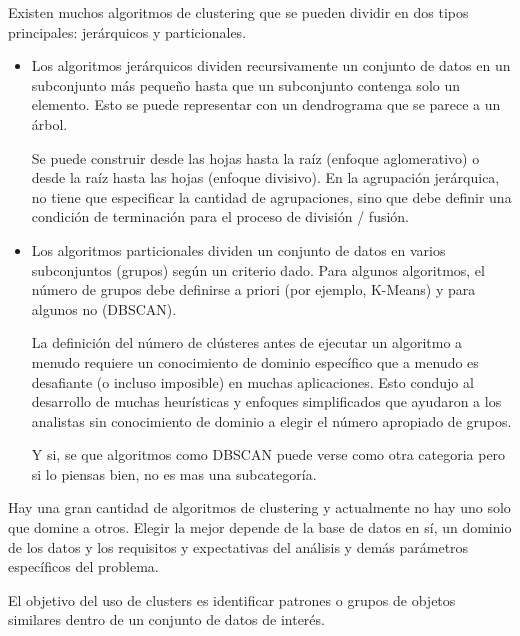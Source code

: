\documentclass[12pt, fleqn]{report}                             %
\theoremstyle{break}                                            %
\begin{document}
        Existen muchos algoritmos de clustering que se pueden dividir en dos tipos principales: 
        jerárquicos y particionales.

        \clearpage

        \begin{itemize}
            \item Los algoritmos jerárquicos dividen recursivamente un conjunto de datos en 
            un subconjunto más pequeño hasta que un subconjunto contenga solo un elemento. 
            Esto se puede representar con un dendrograma que se parece a un árbol. 
            
            Se puede construir desde las hojas hasta la raíz (enfoque aglomerativo) o desde la raíz hasta las hojas 
            (enfoque divisivo). En la agrupación jerárquica, no tiene que especificar la cantidad de agrupaciones, 
            sino que debe definir una condición de terminación para el proceso de división / fusión.

            \item Los algoritmos particionales dividen un conjunto de datos en varios subconjuntos 
            (grupos) según un criterio dado. 
            Para algunos algoritmos, el número de grupos debe definirse a priori (por ejemplo, K-Means) y 
            para algunos no (DBSCAN). 
            
            La definición del número de clústeres antes de ejecutar un algoritmo a menudo requiere un conocimiento
            de dominio específico que a menudo es desafiante (o incluso imposible) en muchas aplicaciones. 
            Esto condujo al desarrollo de muchas heurísticas y enfoques simplificados que ayudaron a los 
            analistas sin conocimiento de dominio a elegir el número apropiado de grupos.

            Y si, se que algoritmos como DBSCAN puede verse como otra categoria pero si lo piensas bien, no es mas 
            una subcategoría. 

        \end{itemize}

        Hay una gran cantidad de algoritmos de clustering y actualmente no hay uno solo que domine
        a otros.
        Elegir la mejor depende de la base de datos en sí, un dominio de los datos y los requisitos
        y expectativas del análisis y demás parámetros específicos del problema.

        El objetivo del uso de clusters es identificar patrones o grupos de objetos similares dentro de un
        conjunto de datos de interés.
\end{document}
